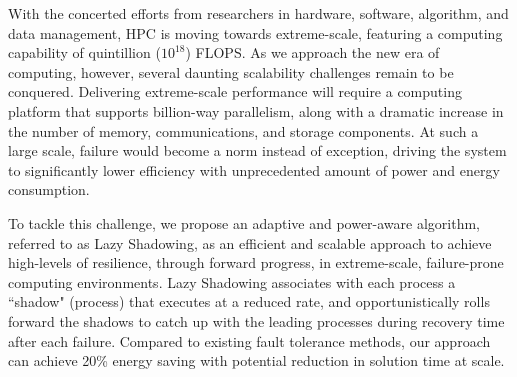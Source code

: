 With the concerted efforts from researchers in hardware, software, algorithm, and data management, HPC is moving towards extreme-scale, featuring a computing capability of quintillion ($10^{18}$) FLOPS. 
As we approach the new era of computing, however, several daunting scalability challenges remain to be conquered. Delivering extreme-scale performance will require a computing platform that supports billion-way parallelism, along with a dramatic increase in the number of memory, communications, and storage components. At such a large scale, failure would become a norm instead of exception, driving the system to significantly lower efficiency with unprecedented amount of power and energy consumption. %

To tackle this challenge, we propose an adaptive and power-aware algorithm, referred to as Lazy Shadowing, as an efficient and scalable approach to achieve high-levels of resilience, through forward progress, in extreme-scale, failure-prone computing environments. 
Lazy Shadowing associates with each process a ``shadow" (process) that executes at a reduced rate, and opportunistically rolls forward the shadows to catch up with the leading processes during recovery time after each failure.
Compared to existing fault tolerance methods, our approach can achieve 20\% energy saving with potential reduction in solution time at scale.
